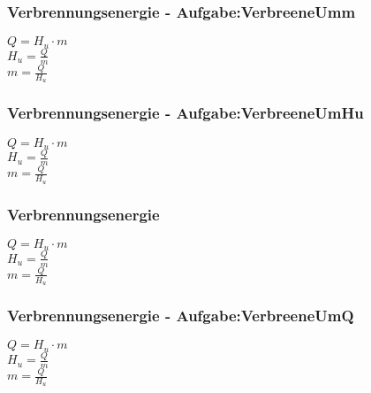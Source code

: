 \subsubsection{Verbrennungsenergie - Aufgabe:VerbreeneUmm} 
\begin{minipage}{0.45\textwidth} 
$ Q = H_{u} \cdot m $\\ 
$ H_{u}  = \frac{Q}{m} $\\ 
$ m = \frac{Q}{H_{u} } $\\ 
\end{minipage} 
\begin{minipage}{0.45\textwidth} 
 
\end{minipage} 
\subsubsection{Verbrennungsenergie - Aufgabe:VerbreeneUmHu} 
\begin{minipage}{0.45\textwidth} 
$ Q = H_{u} \cdot m $\\ 
$ H_{u}  = \frac{Q}{m} $\\ 
$ m = \frac{Q}{H_{u} } $\\ 
\end{minipage} 
\begin{minipage}{0.45\textwidth} 
 
\end{minipage} 
\subsubsection{Verbrennungsenergie} 
\begin{minipage}{0.45\textwidth} 
$ Q = H_{u} \cdot m $\\ 
$ H_{u}  = \frac{Q}{m} $\\ 
$ m = \frac{Q}{H_{u} } $\\ 
\end{minipage} 
\begin{minipage}{0.45\textwidth} 
 
\end{minipage} 
\subsubsection{Verbrennungsenergie - Aufgabe:VerbreeneUmQ} 
\begin{minipage}{0.45\textwidth} 
$ Q = H_{u} \cdot m $\\ 
$ H_{u}  = \frac{Q}{m} $\\ 
$ m = \frac{Q}{H_{u} } $\\ 
\end{minipage} 
\begin{minipage}{0.45\textwidth} 
 
\end{minipage} 

